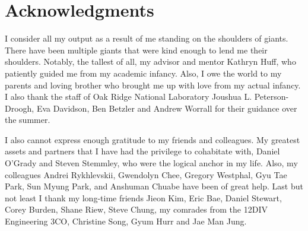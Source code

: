 \documentclass{report}
\begin{document}
\chapter*{Acknowledgments}


I consider all my output as a result of me standing on the shoulders
of giants. There have been multiple giants that were kind enough
to lend me their shoulders. Notably, the tallest of all, my advisor
and mentor Kathryn Huff, who patiently guided me from my academic
infancy. Also, I owe the world to my parents and loving brother who
brought me up with love
from my actual infancy.  I also thank the staff of Oak Ridge National Laboratory
Joushua L. Peterson-Droogh, Eva Davidson, Ben Betzler and Andrew Worrall for their
guidance over the summer.

I also cannot express enough gratitude to my friends and colleagues. My greatest
assets and partners that I have had the privilege to cohabitate with, Daniel
O'Grady and Steven Stemmley, who were the logical anchor in my life. Also, my colleagues
Andrei Rykhlevskii, Gwendolyn Chee, Gregory Westphal, Gyu Tae Park, Sun Myung Park, and
Anshuman Chuabe have been of great help. Last but not least I thank my long-time friends Jieon Kim,
Eric Bae, Daniel Stewart, Corey Burden, Shane Riew, Steve Chung, my comrades from the 12DIV Engineering 3CO,
Christine Song, Gyum Hurr and Jae Man Jung.



\tableofcontents
\listoftables
\listoffigures

\end{document}
